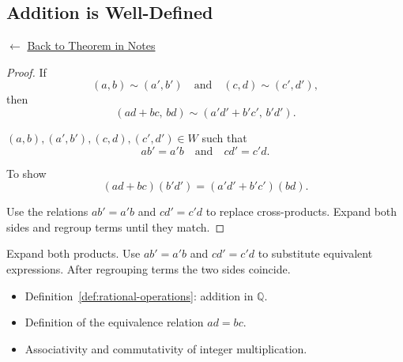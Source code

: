 
\subsection*{Addition is Well-Defined}
\label{prf:q-addition-well-defined}

\begin{remark*}[Return]
$\leftarrow$ \hyperref[thm:q-addition-well-defined]{Back to Theorem in Notes}
\end{remark*}

\begin{proof}

\Claim If
\[
(a,b) \sim (a',b')
\quad \text{and} \quad
(c,d) \sim (c',d'),
\]
then
\[
(ad+bc,\,bd) \sim (a'd'+b'c',\,b'd').
\]

\Given $(a,b),(a',b'),(c,d),(c',d') \in W$ such that
\[
ab' = a'b
\quad\text{and}\quad
cd' = c'd.
\]

\Goal To show
\[
(ad+bc)(b'd') = (a'd'+b'c')(bd).
\]

\Strategy
Use the relations $ab' = a'b$ and $cd' = c'd$ to replace cross-products.
Expand both sides and regroup terms until they match.


\end{proof}

\begin{remark*}
Expand both products.  
Use $ab' = a'b$ and $cd' = c'd$ to substitute equivalent expressions.  
After regrouping terms the two sides coincide.
\end{remark*}

\begin{remark*}[Dependencies]
\begin{itemize}
  \item Definition~\ref{def:rational-operations}: addition in $\mathbb{Q}$.
  \item Definition of the equivalence relation $ad = bc$.
  \item Associativity and commutativity of integer multiplication.
\end{itemize}
\end{remark*}